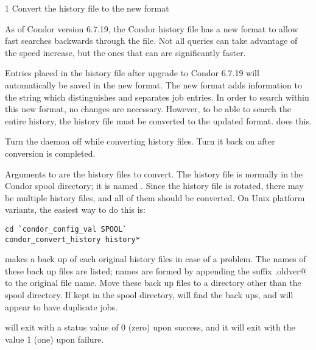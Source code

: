 \begin{ManPage}{\label{man-condor-convert-history}}{1}
{Convert the history file to the new format}
\Synopsis 




\Description

As of Condor version 6.7.19,
the Condor history file has a
new format to allow fast searches backwards through the file.
Not all queries can take advantage of the speed increase,
but the ones that can are significantly faster. 

Entries placed in the history file after upgrade
to Condor 6.7.19 will automatically be saved
in the new format.
The new format adds information to the string which
distinguishes and separates job entries.
In order to search within this new format,
no changes are necessary. 
However, to be able to search the entire history,
the history file must be converted to the updated format.
 does this.

Turn the  daemon off while converting 
history files.
Turn it back on after conversion is completed.

Arguments to  are the
history files to convert.
The history file is normally in the Condor spool directory;
it is named .
Since the history file is rotated,
there may be multiple history files, and all of them should be
converted. On Unix platform variants, the easiest way to do this is:

\begin{verbatim}
cd `condor_config_val SPOOL`
condor_convert_history history*
\end{verbatim}

 makes a
back up of each original history files in case of a problem.
The names of these back up files are listed;
names are formed by appending the suffix \verb@.oldver@
to the original file name.
Move these back up files to a directory other than
the spool directory.
If kept in the spool directory,
 will find the back ups,
and will appear to have duplicate jobs. 

\ExitStatus

 will exit with a status value of 0 (zero)
upon success, and it will exit with the value 1 (one) upon failure.

\end{ManPage}
